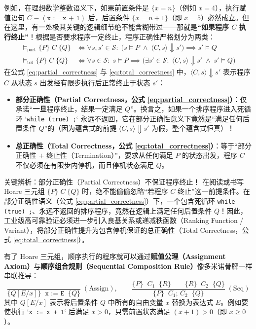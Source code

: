 \documentclass[a4paper]{article}
\begin{document}
例如，在理想数学整数语义下，如果前置条件是 $\{x = n\}$（例如 $x = 4$），执行赋值语句 $C \equiv (\texttt{x := x + 1})$ 后，后置条件 $\{x = n + 1\}$（即 $x = 5$）必然成立。但在这里，有一处极其关键的逻辑细节绝不能含糊带过——那就是\textbf{“如果程序 $C$ 执行终止”}！根据是否要求程序一定终止，程序正确性严格划分为两类：
\begin{align}
\models_{\text{part}} \{P\}\; C\; \{Q\} &\iff \forall s, s' \in \mathcal{S}:\; \big(s \models P \;\land\; \langle C, s \rangle \Downarrow s'\big) \implies s' \models Q \label{eq:partial_correctness} \\
\models_{\text{tot}} \{P\}\; C\; \{Q\} &\iff \forall s \in \mathcal{S}:\; s \models P \implies \big(\exists s' \in \mathcal{S}:\; \langle C, s \rangle \Downarrow s' \;\land\; s' \models Q\big) \label{eq:total_correctness}
\end{align}
在公式 \eqref{eq:partial_correctness} 与 \eqref{eq:total_correctness} 中，$\langle C, s \rangle \Downarrow s'$ 表示程序 $C$ 从状态 $s$ 出发经有限步执行后正常终止于状态 $s'$：
\begin{itemize}
    \item \textbf{部分正确性（Partial Correctness，公式 \eqref{eq:partial_correctness}）}：仅承诺“\textbf{一旦}程序终止，结果一定满足 $Q$”。换言之，如果一个排序程序进入死循环 `\texttt{while (true) ;}` 永远不返回，它在部分正确性意义下竟然是“满足任何后置条件 $Q$”的（因为蕴含式的前提 $\langle C, s \rangle \Downarrow s'$ 为假，整个蕴含式恒真）！
    \item \textbf{总正确性（Total Correctness，公式 \eqref{eq:total_correctness}）}：等于“部分正确性 $+$ 终止性（Termination）”，要求从任何满足 $P$ 的状态出发，程序 $C$ 不仅必须在有限步内停机，而且停机状态满足 $Q$。
\end{itemize}

\begin{warningbox}{关键辨析：部分正确性（Partial Correctness）不保证程序终止！}
在阅读或书写 Hoare 三元组 $\{P\}\; C\; \{Q\}$ 时，绝不能偷偷忽略“若程序 $C$ 终止”这一前提条件。在部分正确性语义（公式 \eqref{eq:partial_correctness}）下，一个包含死循环 \texttt{while (true) ;}、永远不返回的排序程序，竟然在逻辑上满足任何后置条件 $Q$！因此，工业级高可靠验证必须进一步引入良基关系或递减秩函数（Ranking Function / Variant），将部分正确性提升为包含停机保证的总正确性（Total Correctness，公式 \eqref{eq:total_correctness}）。
\end{warningbox}

有了 Hoare 三元组，顺序执行的程序就可以通过\textbf{赋值公理（Assignment Axiom）}与\textbf{顺序组合规则（Sequential Composition Rule）}像多米诺骨牌一样串联推导：
\begin{equation}
\frac{}{\{Q[E/x]\}\;\; \texttt{x := E}\;\; \{Q\}} \;(\text{Assign}), \qquad
\frac{\{P\}\;\; C_1\;\; \{R\} \qquad \{R\}\;\; C_2\;\; \{Q\}}{\{P\}\;\; C_1;\, C_2\;\; \{Q\}} \;(\text{Seq})
\label{eq:hoare_assign_seq}
\end{equation}
其中 $Q[E/x]$ 表示将后置条件 $Q$ 中所有的自由变量 $x$ 替换为表达式 $E$。例如要使执行 `\texttt{x := x + 1}` 后满足 $x > 0$，只需前置状态满足 $(x+1) > 0$（即 $x \ge 0$）。
\end{document}
